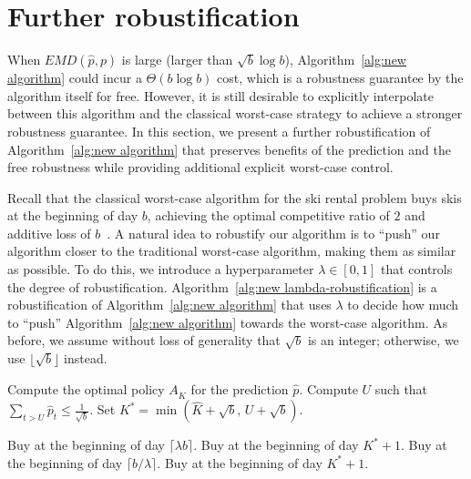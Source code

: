 \section{Further robustification}
\label{sec:further robustification}


When $EMD(\hat p,p)$ is large (larger than $\sqrt{b} \log b$), Algorithm~\ref{alg:new algorithm} could incur a $\Theta(b \log b)$ cost, which is a robustness guarantee by the algorithm itself for free. However, it is still desirable to explicitly interpolate between this algorithm and the classical worst-case strategy to achieve a stronger robustness guarantee. In this section, we present a further robustification of Algorithm~\ref{alg:new algorithm} that preserves benefits of the prediction and the free robustness while providing additional explicit worst-case control.

Recall that the classical worst-case algorithm for the ski rental problem buys skis at the beginning of day $b$, achieving the optimal competitive ratio of $2$ and additive loss of $b$~\cite{Karlin1986CompetitiveSC}. A natural idea to robustify our algorithm is to ``push'' our algorithm closer to the traditional worst-case algorithm, making them as similar as possible. To do this, we introduce a hyperparameter $\lambda\in[0,1]$ that controls the degree of robustification. Algorithm~\ref{alg:new lambda-robustification} is a robustification of Algorithm~\ref{alg:new algorithm} that uses $\lambda$ to decide how much to ``push'' Algorithm~\ref{alg:new algorithm} towards the worst-case algorithm. As before, we assume without loss of generality that $\sqrt b$ is an integer; otherwise, we use $\lfloor\sqrt b\rfloor$ instead.


\begin{algorithm}
\caption{Further robustification of Algorithm~\ref{alg:new algorithm}}
\label{alg:new lambda-robustification}
\begin{algorithmic}[1]

\STATE Compute the optimal policy $A_{\hat{K}}$ for the prediction $\hat{p}$.
\STATE Compute $U$ such that $\sum_{t>U} \hat{p}_t \le \frac{1}{\sqrt{b}}$.
\STATE Set $K^* = \min(\hat{K} + \sqrt{b},\, U + \sqrt{b})$.

        \STATE Buy at the beginning of day $\lceil \lambda b \rceil$.
    \ELSE
        \STATE Buy at the beginning of day $K^* + 1$.
    \ENDIF
\ELSE
        \STATE Buy at the beginning of day $\lceil b/\lambda \rceil$.
    \ELSE
        \STATE Buy at the beginning of day $K^* + 1$.
    \ENDIF
\ENDIF

\end{algorithmic}
\end{algorithm}



